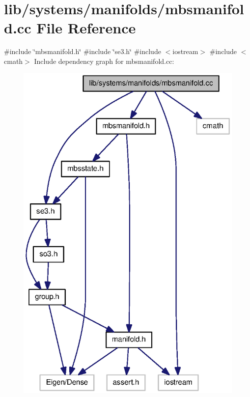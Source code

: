 \section{lib/systems/manifolds/mbsmanifold.cc \-File \-Reference}
\label{mbsmanifold_8cc}
{\ttfamily \#include \char`\"{}mbsmanifold.\-h\char`\"{}}\*
{\ttfamily \#include \char`\"{}se3.\-h\char`\"{}}\*
{\ttfamily \#include $<$iostream$>$}\*
{\ttfamily \#include $<$cmath$>$}\*
\-Include dependency graph for mbsmanifold.\-cc\-:
\nopagebreak
\begin{figure}[H]
\begin{center}
\leavevmode
\includegraphics[width=320pt]{mbsmanifold_8cc__incl}
\end{center}
\end{figure}
